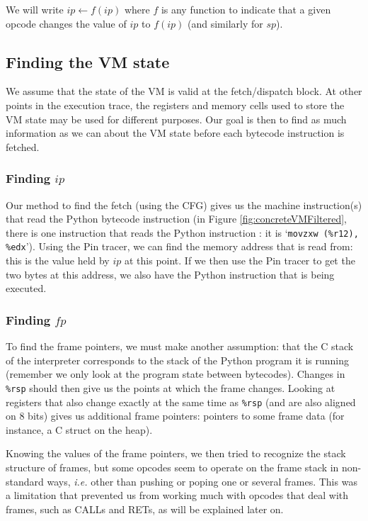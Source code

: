 \documentclass[english]{article}
\begin{document}
We will write $ip \leftarrow f(ip)$ where $f$ is any function to indicate that a given opcode changes the value of $ip$ to $f(ip)$ (and similarly for $sp$).

\subsection{Finding the VM state}

We assume that the state of the VM is valid at the fetch/dispatch block. At other points in the execution trace, the registers and memory cells used to store the VM state may be used for different purposes. Our goal is then to find as much information as we can about the VM state before each bytecode instruction is fetched.

\subsubsection{Finding $ip$}

Our method to find the fetch (using the CFG) gives us the machine instruction(s) that read the Python bytecode instruction (in Figure \ref{fig:concreteVMFiltered}, there is one instruction that reads the Python instruction : it is `\texttt{movzxw (\%r12), \%edx}'). Using the Pin tracer, we can find the memory address that is read from: this is the value held by $ip$ at this point. If we then use the Pin tracer to get the two bytes at this address, we also have the Python instruction that is being executed.

\subsubsection{Finding $fp$}

To find the frame pointers, we must make another assumption: that the C stack of the interpreter corresponds to the stack of the Python program it is running (remember we only look at the program state between bytecodes). Changes in \texttt{\%rsp} should then give us the points at which the frame changes. Looking at registers that also change exactly at the same time as \texttt{\%rsp} (and are also aligned on 8 bits) gives us additional frame pointers: pointers to some frame data (for instance, a C struct on the heap).

Knowing the values of the frame pointers, we then tried to recognize the stack structure of frames, but some opcodes seem to operate on the frame stack in non-standard ways, \textit{i.e.} other than pushing or poping one or several frames. This was a limitation that prevented us from working much with opcodes that deal with frames, such as CALLs and RETs, as will be explained later on.
\end{document}
